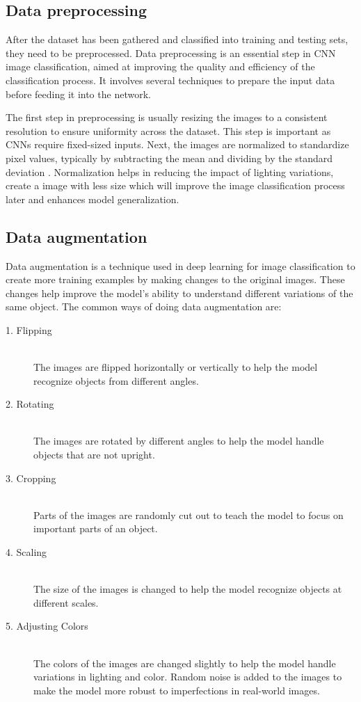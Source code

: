 \subsection{ Data preprocessing}
\vspace{-18pt}
After the dataset has been gathered and classified into training and testing sets, they need to be preprocessed. Data preprocessing is an essential step in CNN image classification, aimed at improving the quality and efficiency of the classification process. It involves several techniques to prepare the input data before feeding it into the network.
\par
 The first step in preprocessing is usually resizing the images to a consistent resolution to ensure uniformity across the dataset. This step is important as CNNs require fixed-sized inputs. Next, the images are normalized to standardize pixel values, typically by subtracting the mean and dividing by the standard deviation . Normalization helps in reducing the impact of lighting variations, create a image with less size which will improve the image classification process later and enhances model generalization.

\subsection{Data augmentation}
\vspace{-18pt}
Data augmentation is a technique used in deep learning for image classification to create more training examples by making changes to the original images. These changes help improve the model's ability to understand different variations of the same object. The common ways of doing data augmentation are:
\begin{description}
\item[1. Flipping] \hfill \\
 The images are flipped horizontally or vertically to help the model recognize objects from different angles.
\item[2. Rotating] \hfill \\
 The images are rotated by different angles to help the model handle objects that are not upright.
 \item[3. Cropping] \hfill \\
 Parts of the images are randomly cut out to teach the model to focus on important parts of an object.
 \item[4. Scaling] \hfill \\
The size of the images is changed to help the model recognize objects at different scales.
 \item[5. Adjusting Colors] \hfill \\
 The colors of the images are changed slightly to help the model handle variations in lighting and color.
 Random noise is added to the images to make the model more robust to imperfections in real-world images.
\end{description}
\par 

